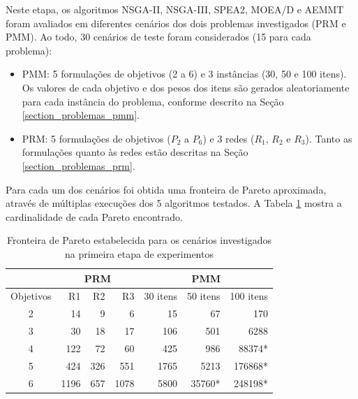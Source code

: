 Neste etapa, os algoritmos NSGA-II, NSGA-III, SPEA2, MOEA/D e AEMMT foram avaliados em diferentes cenários dos dois problemas investigados (PRM e PMM). Ao todo, 30 cenários de teste foram considerados (15 para cada problema):

\begin{itemize}
	\item PMM: 5 formulações de objetivos (2 a 6) e 3 instâncias (30, 50 e 100 itens). Os valores de cada objetivo e dos pesos dos itens são gerados aleatoriamente para cada instância do problema, conforme descrito na Seção \ref{section_problemas_pmm}.
	\item PRM: 5 formulações de objetivos ($P_2$ a $P_6$) e 3 redes ($R_1$, $R_2$ e $R_3$). Tanto as formulações quanto às redes estão descritas na Seção \ref{section_problemas_prm}.
\end{itemize}

Para cada um dos cenários foi obtida uma fronteira de Pareto aproximada, através de múltiplas execuções dos 5 algoritmos testados. A Tabela \ref{table_exp1_paretos} mostra a cardinalidade de cada Pareto encontrado.

\begin{table}[!htbp]
	\centering
	\caption{Fronteira de Pareto estabelecida para os cenários investigados na primeira etapa de experimentos}
	\label{table_exp1_paretos}
	\begin{tabular}{c|rrr|rrr}
		& \multicolumn{3}{c|}{\textbf{PRM}} & \multicolumn{3}{c}{\textbf{PMM}} \\ \hline
		Objetivos & R1         & R2       & R3        & 30 itens  & 50 itens & 100 itens \\ \hline
		2         & 14         & 9        & 6         & 15        & 67       & 170       \\
		3         & 30         & 18       & 17        & 106       & 501      & 6288      \\
		4         & 122        & 72       & 60        & 425       & 986      & 88374*    \\
		5         & 424        & 326      & 551       & 1765      & 5213     & 176868*   \\
		6         & 1196       & 657      & 1078      & 5800      & 35760*   & 248198*   \\ \hline
	\end{tabular}
\end{table}

